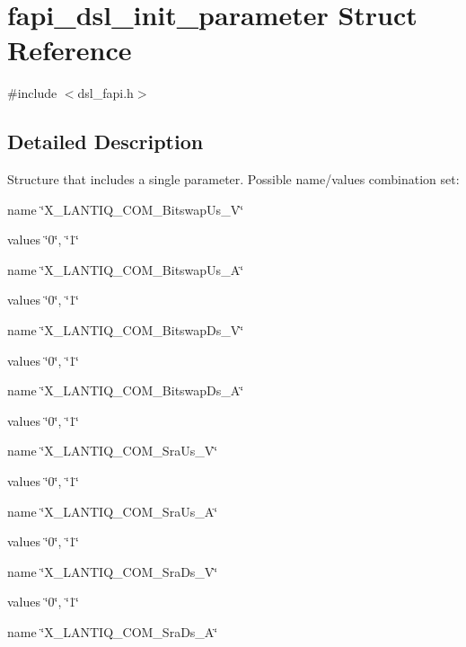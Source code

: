 \hypertarget{structfapi__dsl__init__parameter}{\section{fapi\-\_\-dsl\-\_\-init\-\_\-parameter Struct Reference}
\label{structfapi__dsl__init__parameter}
}


{\ttfamily \#include $<$dsl\-\_\-fapi.\-h$>$}



\subsection{Detailed Description}
Structure that includes a single parameter. Possible name/values combination set\-:
\begin{DoxyItemize}
\item name \char`\"{}\-X\-\_\-\-L\-A\-N\-T\-I\-Q\-\_\-\-C\-O\-M\-\_\-\-Bitswap\-Us\-\_\-\-V\char`\"{}
\item values \char`\"{}0\char`\"{}, \char`\"{}1\char`\"{}
\item name \char`\"{}\-X\-\_\-\-L\-A\-N\-T\-I\-Q\-\_\-\-C\-O\-M\-\_\-\-Bitswap\-Us\-\_\-\-A\char`\"{}
\item values \char`\"{}0\char`\"{}, \char`\"{}1\char`\"{}
\item name \char`\"{}\-X\-\_\-\-L\-A\-N\-T\-I\-Q\-\_\-\-C\-O\-M\-\_\-\-Bitswap\-Ds\-\_\-\-V\char`\"{}
\item values \char`\"{}0\char`\"{}, \char`\"{}1\char`\"{}
\item name \char`\"{}\-X\-\_\-\-L\-A\-N\-T\-I\-Q\-\_\-\-C\-O\-M\-\_\-\-Bitswap\-Ds\-\_\-\-A\char`\"{}
\item values \char`\"{}0\char`\"{}, \char`\"{}1\char`\"{}
\item name \char`\"{}\-X\-\_\-\-L\-A\-N\-T\-I\-Q\-\_\-\-C\-O\-M\-\_\-\-Sra\-Us\-\_\-\-V\char`\"{}
\item values \char`\"{}0\char`\"{}, \char`\"{}1\char`\"{}
\item name \char`\"{}\-X\-\_\-\-L\-A\-N\-T\-I\-Q\-\_\-\-C\-O\-M\-\_\-\-Sra\-Us\-\_\-\-A\char`\"{}
\item values \char`\"{}0\char`\"{}, \char`\"{}1\char`\"{}
\item name \char`\"{}\-X\-\_\-\-L\-A\-N\-T\-I\-Q\-\_\-\-C\-O\-M\-\_\-\-Sra\-Ds\-\_\-\-V\char`\"{}
\item values \char`\"{}0\char`\"{}, \char`\"{}1\char`\"{}
\item name \char`\"{}\-X\-\_\-\-L\-A\-N\-T\-I\-Q\-\_\-\-C\-O\-M\-\_\-\-Sra\-Ds\-\_\-\-A\char`\"{}

\end{DoxyItemize}
